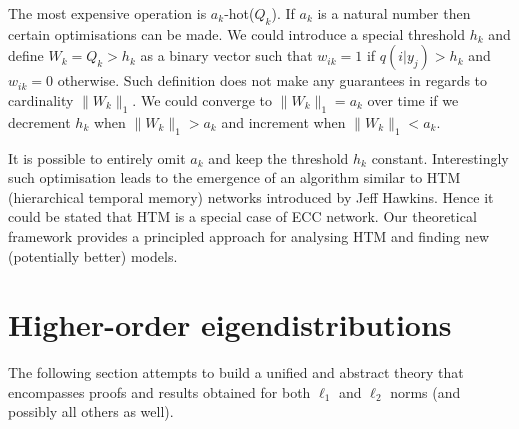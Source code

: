 \documentclass[12pt]{article}
\begin{document}
The most expensive operation is $a_k$-hot($Q_k$). If $a_k$ is a natural number then certain optimisations can be made. We could introduce a special threshold $h_{k}$ and define $W_k = Q_k>h_k$ as a binary vector such that $w_{ik}=1$ if $q(i|y_j)>h_k$ and $w_{ik}=0$ otherwise. Such definition does not make any guarantees in regards to cardinality $\lVert W_k \rVert_1$. We could converge to $\lVert W_k \rVert_1=a_k$ over time if we decrement $h_k$ when $\lVert W_k \rVert_1>a_k$ and increment when $\lVert W_k \rVert_1<a_k$.

It is possible to entirely omit $a_k$ and keep the threshold $h_k$ constant.  Interestingly such optimisation leads to the emergence of an algorithm similar to HTM (hierarchical temporal memory) networks introduced by Jeff Hawkins. Hence it could be stated that HTM is a special case of ECC network. Our theoretical framework provides a principled approach for analysing HTM and finding new (potentially better) models.


\section{Higher-order eigendistributions}

The following section attempts to build a unified and abstract theory that encompasses proofs and results obtained for both $\ell_1$ and $\ell_2$ norms (and possibly all others as well).
\end{document}
